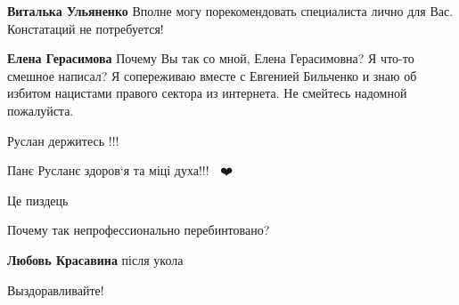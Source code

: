 \begin{itemize}
\begin{itemize}
\textbf{Виталька Ульяненко} Вполне могу порекомендовать специалиста лично для Вас. Констатаций не потребуется! 🙂

\textbf{Елена Герасимова}
Почему Вы так со мной, Елена Герасимовна?
Я что-то смешное написал?
Я сопереживаю вместе с Евгенией Бильченко и знаю об избитом нацистами правого сектора из интернета.
Не смейтесь надомной пожалуйста.
\end{itemize}

Руслан держитесь !!!


Панє Русланє здоров‘я та міці духа!!! 🙏🏻❤️

Це пиздець

Почему так непрофессионально перебинтовано?

\textbf{Любовь Красавина} після укола

Выздоравливайте!

\end{itemize}


